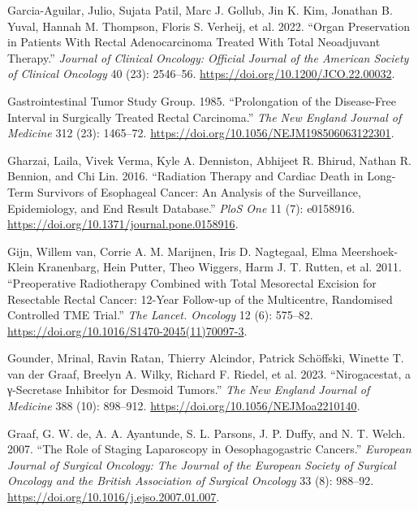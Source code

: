 \documentclass[
  letterpaper,
]{scrbook}
\newlength{\cslhangindent}
\newenvironment{CSLReferences}[2] %
 {\begin{list}{}{%
  \setlength{\itemindent}{0pt}
  \setlength{\leftmargin}{0pt}
  \setlength{\parsep}{0pt}
  \ifodd #1
   \setlength{\leftmargin}{\cslhangindent}
   \setlength{\itemindent}{-1\cslhangindent}
  \fi
  \setlength{\itemsep}{#2\baselineskip}}}
 {\end{list}}
\begin{document}
\begin{CSLReferences}{1}{0}
Garcia-Aguilar, Julio, Sujata Patil, Marc J. Gollub, Jin K. Kim,
Jonathan B. Yuval, Hannah M. Thompson, Floris S. Verheij, et al. 2022.
{``Organ {Preservation} in {Patients} {With} {Rectal} {Adenocarcinoma}
{Treated} {With} {Total} {Neoadjuvant} {Therapy}.''} \emph{Journal of
Clinical Oncology: Official Journal of the American Society of Clinical
Oncology} 40 (23): 2546--56. \url{https://doi.org/10.1200/JCO.22.00032}.

Gastrointestinal Tumor Study Group. 1985. {``Prolongation of the
Disease-Free Interval in Surgically Treated Rectal Carcinoma.''}
\emph{The New England Journal of Medicine} 312 (23): 1465--72.
\url{https://doi.org/10.1056/NEJM198506063122301}.

Gharzai, Laila, Vivek Verma, Kyle A. Denniston, Abhijeet R. Bhirud,
Nathan R. Bennion, and Chi Lin. 2016. {``Radiation {Therapy} and
{Cardiac} {Death} in {Long}-{Term} {Survivors} of {Esophageal} {Cancer}:
{An} {Analysis} of the {Surveillance}, {Epidemiology}, and {End}
{Result} {Database}.''} \emph{PloS One} 11 (7): e0158916.
\url{https://doi.org/10.1371/journal.pone.0158916}.

Gijn, Willem van, Corrie A. M. Marijnen, Iris D. Nagtegaal, Elma
Meershoek-Klein Kranenbarg, Hein Putter, Theo Wiggers, Harm J. T.
Rutten, et al. 2011. {``Preoperative Radiotherapy Combined with Total
Mesorectal Excision for Resectable Rectal Cancer: 12-Year Follow-up of
the Multicentre, Randomised Controlled {TME} Trial.''} \emph{The Lancet.
Oncology} 12 (6): 575--82.
\url{https://doi.org/10.1016/S1470-2045(11)70097-3}.

Gounder, Mrinal, Ravin Ratan, Thierry Alcindor, Patrick Schöffski,
Winette T. van der Graaf, Breelyn A. Wilky, Richard F. Riedel, et al.
2023. {``Nirogacestat, a γ-{Secretase} {Inhibitor} for {Desmoid}
{Tumors}.''} \emph{The New England Journal of Medicine} 388 (10):
898--912. \url{https://doi.org/10.1056/NEJMoa2210140}.

Graaf, G. W. de, A. A. Ayantunde, S. L. Parsons, J. P. Duffy, and N. T.
Welch. 2007. {``The Role of Staging Laparoscopy in Oesophagogastric
Cancers.''} \emph{European Journal of Surgical Oncology: The Journal of
the European Society of Surgical Oncology and the British Association of
Surgical Oncology} 33 (8): 988--92.
\url{https://doi.org/10.1016/j.ejso.2007.01.007}.


\end{CSLReferences}
\end{document}
